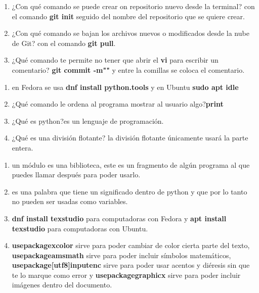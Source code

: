 \documentclass[letterpaper, 12pt, twoside]{article}
\begin{document}
    \title{\Large\color{red}} 
    \begin{enumerate}
    	\item{\Large ¿Con qué comando se puede crear on repositorio nuevo desde la terminal?} con el comando \textbf{git init} seguido del nombre del repositorio que se quiere crear.
    	\item{\Large ¿Con qué comando se bajan los archivos nuevos o modificados desde la nube de Git?} con el comando \textbf{git pull}.
    	 \item{\Large ¿Qué comando te permite no tener que abrir el \textbf{vi} para escribir un comentario?} \textbf{git commit -m""} y entre la comillas se coloca el comentario.
    \end{enumerate}

    \title{\Large\color{red}} 
    \begin{enumerate}
     	\item{} en Fedora se usa \textbf{dnf install python.tools} y en Ubuntu \textbf{sudo apt idle}
     	\item{\Large ¿Qué comando le ordena al programa mostrar al usuario algo?}\textbf{print}
     	\item{\Large ¿Qué es python?}es un lenguaje de programación.
     	 \item{\Large ¿Qué es una división flotante?} la división flotante únicamente usará la parte entera.
    \end{enumerate}

    \title{\Large\color{red}} 
    \begin{enumerate}
    	\item{} un módulo es una biblioteca, este es un fragmento de algún programa al que puedes llamar después para poder usarlo.
    	\item{} es una palabra que tiene un significado dentro de python y que por lo tanto no pueden ser usadas como variables.
    	\item{}\textbf{dnf install texstudio} para computadoras con Fedora y \textbf{apt install texstudio} para computadoras con Ubuntu.
    	\item{} \textbf{usepackage{xcolor}} sirve para poder cambiar de color cierta parte del texto, \textbf{usepackage{amsmath}} sirve para poder incluir símbolos matemáticos, \textbf{usepackage[utf8]{inputenc}} sirve para poder usar acentos y diéresis sin que te lo marque como error y \textbf{usepackage{graphicx}} sirve para poder incluir imágenes dentro del documento.
    \end{enumerate}
\end{document}
